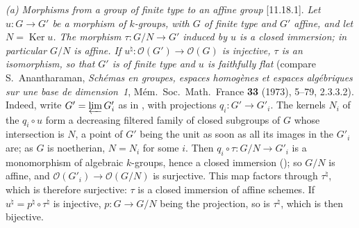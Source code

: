 \par\smallskip\noindent\textit{(a) Morphisms from a group of finite type to an affine
group} [11.18.1]. \emph{Let \(u:G\to G'\) be a morphism of \(k\)-groups, with \(G\) of
finite type and \(G'\) affine, and let \(N=\operatorname{Ker}u\). The morphism
\(\tau:G/N\to G'\) induced by \(u\) is a closed immersion; in particular \(G/N\) is affine.
If \(u^\natural:\mathcal O(G')\to\mathcal O(G)\) is injective, \(\tau\) is an isomorphism,
so that \(G'\) is of finite type and \(u\) is faithfully flat} (compare S.~Anantharaman,
\emph{Sch\'emas en groupes, espaces homog\`enes et espaces alg\'ebriques sur une base de
dimension~1}, M\'em.\ Soc.\ Math.\ France \textbf{33} (1973), 5--79, 2.3.3.2). Indeed,
write \(G'=\varprojlim G'_i\) as in , with
projections \(q_i:G'\to G'_i\). The kernels \(N_i\) of the \(q_i\circ u\) form a
decreasing filtered family of closed subgroups of \(G\) whose intersection is \(N\), a
point of \(G'\) being the unit as soon as all its images in the \(G'_i\) are; as \(G\) is
noetherian, \(N=N_i\) for some \(i\). Then \(q_i\circ\tau:G/N\to G'_i\) is a monomorphism
of algebraic \(k\)-groups, hence a closed immersion
\textup{()}; so \(G/N\) is affine, and
\(\mathcal O(G'_i)\to\mathcal O(G/N)\) is surjective. This map factors through
\(\tau^\natural\), which is therefore surjective: \(\tau\) is a closed immersion of affine
schemes. If \(u^\natural=p^\natural\circ\tau^\natural\) is injective, \(p:G\to G/N\) being
the projection, so is \(\tau^\natural\), which is then bijective.

